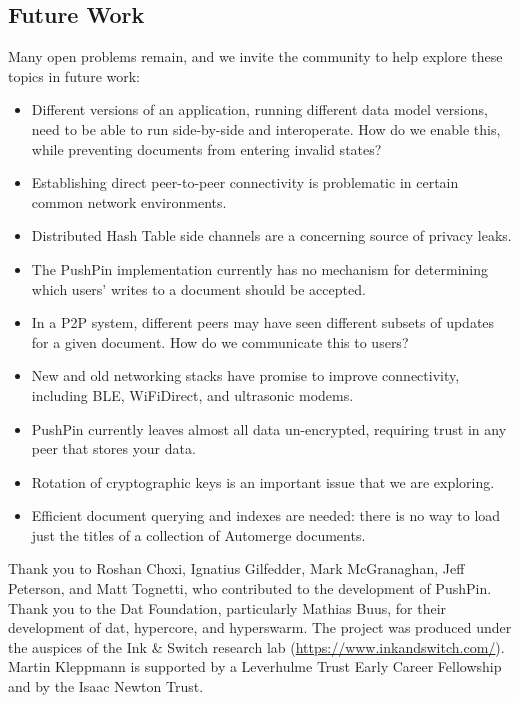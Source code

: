 \documentclass[sigplan,10pt]{acmart}
\begin{document}
\subsection{Future Work}
Many open problems remain, and we invite the community to help explore these topics in future work:
\begin{itemize}
    \item Different versions of an application, running different data model versions, need to be able to run side-by-side and interoperate. How do we enable this, while preventing documents from entering invalid states?
    \item Establishing direct peer-to-peer connectivity is problematic in certain common network environments.
    \item Distributed Hash Table side channels are a concerning source of privacy leaks.
    \item The PushPin implementation currently has no mechanism for determining which users' writes to a document should be accepted.
    \item In a P2P system, different peers may have seen different subsets of updates for a given document. How do we communicate this to users?
    \item New and old networking stacks have promise to improve connectivity, including BLE, WiFiDirect, and ultrasonic modems.
    \item PushPin currently leaves almost all data un-encrypted, requiring trust in any peer that stores your data.
    \item Rotation of cryptographic keys is an important issue that we are exploring.
    \item Efficient document querying and indexes are needed: there is no way to load just the titles of a collection of Automerge documents.
\end{itemize}

\begin{acks}
Thank you to Roshan Choxi, Ignatius Gilfedder, Mark McGranaghan, Jeff Peterson, and Matt Tognetti, who contributed to the development of PushPin.
Thank you to the Dat Foundation, particularly Mathias Buus, for their development of dat, hypercore, and hyperswarm.
The project was produced under the auspices of the Ink \& Switch research lab (\url{https://www.inkandswitch.com/}).
Martin Kleppmann is supported by a Leverhulme Trust Early Career Fellowship and by the Isaac Newton Trust.
\end{acks}


{}
\end{document}
